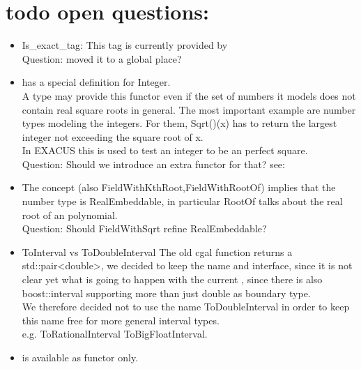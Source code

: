 


\section{todo open questions:}

\begin{itemize} 
\item Is\_exact\_tag: This tag is currently provided by \\
Question: moved it to a global place? 
\item {} has a special definition for Integer. \\
        A type may provide this functor even if the set of 
        numbers it models does not contain real square roots in general. 
        The most important example are number types modeling the integers. 
        For them, Sqrt()(x) has to return the largest integer not exceeding 
        the square root of x.\\
        In EXACUS this is used to test an integer to be an perfect square. \\
        Question: Should we introduce an extra functor for that?
        see: 
\item The concept  (also FieldWithKthRoot,FieldWithRootOf) 
      implies that the number type is RealEmbeddable, in particular RootOf talks 
      about the real root of an polynomial.\\
      Question: Should FieldWithSqrt refine RealEmbeddable?  
\item ToInterval vs ToDoubleInterval The old cgal function 
       returns a
      std::pair<double>, we decided to keep the name and interface, since it is not 
      clear yet what is going to happen with the current , 
      since there is also boost::interval supporting more than just double as 
      boundary type.\\
      We therefore decided not to use the name ToDoubleInterval in order to keep 
      this name free for more general interval types. \\
      e.g. ToRationalInterval ToBigFloatInterval. 
\item {} is available as functor only.
 
\end{itemize}

